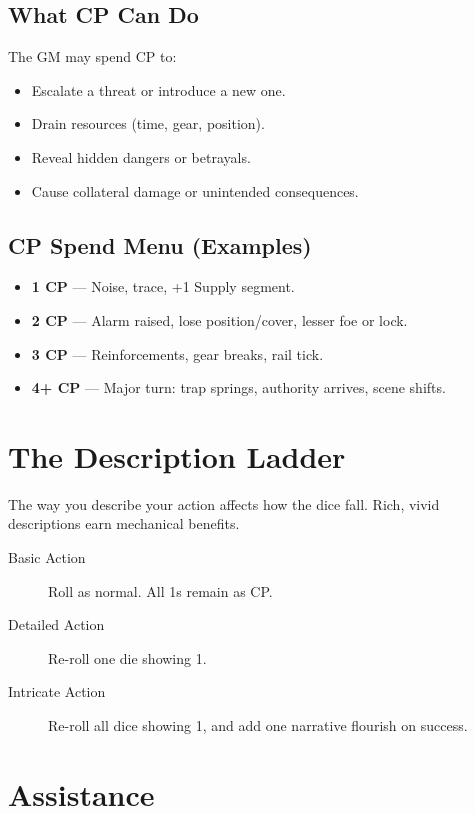 \subsection*{What CP Can Do}

The GM may spend CP to:
\begin{itemize}
  \item Escalate a threat or introduce a new one.
  \item Drain resources (time, gear, position).
  \item Reveal hidden dangers or betrayals.
  \item Cause collateral damage or unintended consequences.
\end{itemize}

\subsection*{CP Spend Menu (Examples)}

\begin{itemize}
  \item \textbf{1 CP} — Noise, trace, +1 Supply segment.
  \item \textbf{2 CP} — Alarm raised, lose position/cover, lesser foe or lock.
  \item \textbf{3 CP} — Reinforcements, gear breaks, rail tick.
  \item \textbf{4+ CP} — Major turn: trap springs, authority arrives, scene shifts.
\end{itemize}

\section{The Description Ladder}

The way you describe your action affects how the dice fall. Rich, vivid descriptions earn mechanical benefits.

\begin{description}
  \item[Basic Action] Roll as normal. All 1s remain as CP.
  \item[Detailed Action] Re-roll one die showing 1.
  \item[Intricate Action] Re-roll all dice showing 1, and add one narrative flourish on success.
\end{description}

\section{Assistance}

